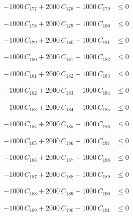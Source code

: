 \documentclass[a4paper,11pt]{article}
\begin{document}
\begin{align}
-1000\,C_{177} + 2000\,C_{178} - 1000\,C_{179} &\leq 0 \nonumber
\end{align}

\begin{align}
-1000\,C_{178} + 2000\,C_{179} - 1000\,C_{180} &\leq 0 \nonumber
\end{align}

\begin{align}
-1000\,C_{179} + 2000\,C_{180} - 1000\,C_{181} &\leq 0 \nonumber
\end{align}

\begin{align}
-1000\,C_{180} + 2000\,C_{181} - 1000\,C_{182} &\leq 0 \nonumber
\end{align}

\begin{align}
-1000\,C_{181} + 2000\,C_{182} - 1000\,C_{183} &\leq 0 \nonumber
\end{align}

\begin{align}
-1000\,C_{182} + 2000\,C_{183} - 1000\,C_{184} &\leq 0 \nonumber
\end{align}

\begin{align}
-1000\,C_{183} + 2000\,C_{184} - 1000\,C_{185} &\leq 0 \nonumber
\end{align}

\begin{align}
-1000\,C_{184} + 2000\,C_{185} - 1000\,C_{186} &\leq 0 \nonumber
\end{align}

\begin{align}
-1000\,C_{185} + 2000\,C_{186} - 1000\,C_{187} &\leq 0 \nonumber
\end{align}

\begin{align}
-1000\,C_{186} + 2000\,C_{187} - 1000\,C_{188} &\leq 0 \nonumber
\end{align}

\begin{align}
-1000\,C_{187} + 2000\,C_{188} - 1000\,C_{189} &\leq 0 \nonumber
\end{align}

\begin{align}
-1000\,C_{188} + 2000\,C_{189} - 1000\,C_{190} &\leq 0 \nonumber
\end{align}

\begin{align}
-1000\,C_{189} + 2000\,C_{190} - 1000\,C_{191} &\leq 0 \nonumber
\end{align}
\end{document}
